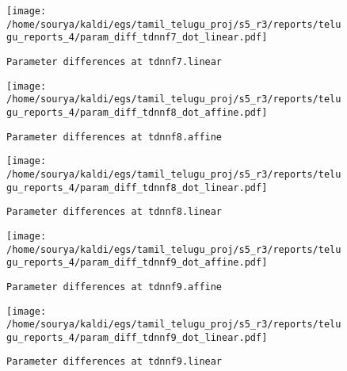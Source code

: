 \documentclass[prl,10pt,twocolumn]{revtex4}
\begin{document}
\newpage
\begin{figure}[h]
  \begin{center}
    \caption{\texttt{Parameter differences at tdnnf7.linear}}
    \texttt{[image: /home/sourya/kaldi/egs/tamil\_telugu\_proj/s5\_r3/reports/telugu\_reports\_4/param\_diff\_tdnnf7\_dot\_linear.pdf]}
  \end{center}
\end{figure}
\clearpage


\newpage
\begin{figure}[h]
  \begin{center}
    \caption{\texttt{Parameter differences at tdnnf8.affine}}
    \texttt{[image: /home/sourya/kaldi/egs/tamil\_telugu\_proj/s5\_r3/reports/telugu\_reports\_4/param\_diff\_tdnnf8\_dot\_affine.pdf]}
  \end{center}
\end{figure}
\clearpage


\newpage
\begin{figure}[h]
  \begin{center}
    \caption{\texttt{Parameter differences at tdnnf8.linear}}
    \texttt{[image: /home/sourya/kaldi/egs/tamil\_telugu\_proj/s5\_r3/reports/telugu\_reports\_4/param\_diff\_tdnnf8\_dot\_linear.pdf]}
  \end{center}
\end{figure}
\clearpage


\newpage
\begin{figure}[h]
  \begin{center}
    \caption{\texttt{Parameter differences at tdnnf9.affine}}
    \texttt{[image: /home/sourya/kaldi/egs/tamil\_telugu\_proj/s5\_r3/reports/telugu\_reports\_4/param\_diff\_tdnnf9\_dot\_affine.pdf]}
  \end{center}
\end{figure}
\clearpage


\newpage
\begin{figure}[h]
  \begin{center}
    \caption{\texttt{Parameter differences at tdnnf9.linear}}
    \texttt{[image: /home/sourya/kaldi/egs/tamil\_telugu\_proj/s5\_r3/reports/telugu\_reports\_4/param\_diff\_tdnnf9\_dot\_linear.pdf]}
  \end{center}
\end{figure}
\clearpage
\end{document}
